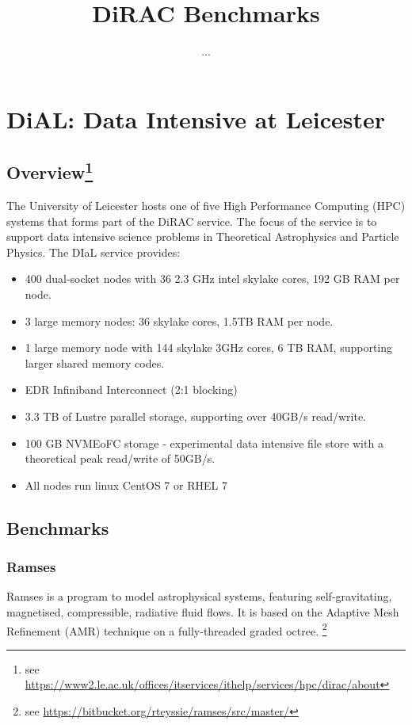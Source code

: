 \documentclass[10pt]{article}
\title{DiRAC Benchmarks}
\author{...}
\begin{document}
\maketitle

\section{DiAL: Data Intensive at Leicester}

\subsection{Overview{\footnote{see \url{https://www2.le.ac.uk/offices/itservices/ithelp/services/hpc/dirac/about}}}
}

The University of Leicester hosts one of five High Performance Computing (HPC) systems that forms part of the DiRAC service. The focus of the service is to support data intensive science problems in Theoretical Astrophysics and Particle Physics. The DIaL service provides:

\begin{itemize}
	\item 400 dual-socket nodes with 36 2.3 GHz intel skylake cores, 192 GB RAM per node.
	\item 3 large memory nodes: 36 skylake cores, 1.5TB RAM per node.
	\item 1 large memory node with 144 skylake 3GHz cores, 6 TB RAM, supporting larger shared memory codes.
	\item EDR Infiniband Interconnect (2:1 blocking)
	\item 3.3 TB of Lustre parallel storage, supporting over 40GB/s read/write.
	\item 100 GB NVMEoFC storage - experimental data intensive file store with a theoretical peak read/write of 50GB/s.
	\item All nodes run linux CentOS 7 or RHEL 7
\end{itemize}

\clearpage
\subsection{Benchmarks}

\subsubsection{Ramses}
Ramses is a program to model astrophysical systems, featuring
self-gravitating, magnetised, compressible, radiative fluid flows. It is based
on the Adaptive Mesh Refinement (AMR) technique on a fully-threaded graded octree.
\footnote{see \url{https://bitbucket.org/rteyssie/ramses/src/master/}}
\end{document}
